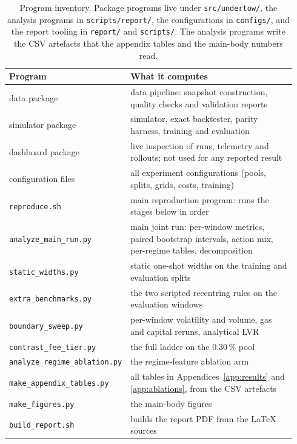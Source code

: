 \begin{table}[tbp]
\caption{Program inventory. Package programs live under \texttt{src/undertow/},
the analysis programs in \texttt{scripts/report/}, the configurations in
\texttt{configs/}, and the report tooling in \texttt{report/} and
\texttt{scripts/}. The analysis programs write the CSV artefacts that the
appendix tables and the main-body numbers read.}
\label{tab:app:programs}
\centering
\small
\begin{tabular}{@{}L{0.34\linewidth}L{0.60\linewidth}@{}}
\toprule
\textbf{Program} & \textbf{What it computes} \\
\midrule
data package & data pipeline: snapshot construction, quality checks and validation reports \\
simulator package & simulator, exact backtester, parity harness, training and evaluation \\
dashboard package & live inspection of runs, telemetry and rollouts; not used for any reported result \\
configuration files & all experiment configurations (pools, splits, grids, costs, training) \\
\texttt{reproduce.sh} & main reproduction program: runs the stages below in order \\
\texttt{analyze\_main\_run.py} & main joint run: per-window metrics, paired bootstrap intervals, action mix, per-regime tables, decomposition \\
\texttt{static\_widths.py} & static one-shot widths on the training and evaluation splits \\
\texttt{extra\_benchmarks.py} & the two scripted recentring rules on the evaluation windows \\
\texttt{boundary\_sweep.py} & per-window volatility and volume, gas and capital reruns, analytical LVR \\
\texttt{contrast\_fee\_tier.py} & the full ladder on the $0.30\,\%$ pool \\
\texttt{analyze\_regime\_ablation.py} & the regime-feature ablation arm \\
\texttt{make\_appendix\_tables.py} & all tables in Appendices~\ref{app:results} and \ref{app:ablations}, from the CSV artefacts \\
\texttt{make\_figures.py} & the main-body figures \\
\texttt{build\_report.sh} & builds the report PDF from the LaTeX sources \\
\bottomrule
\end{tabular}
\end{table}

